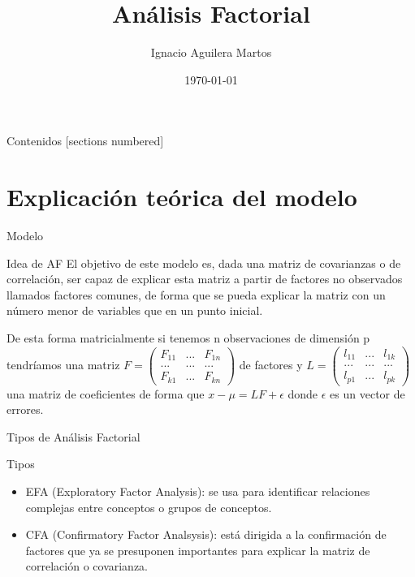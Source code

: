 \documentclass[10pt]{beamer}
\title{Análisis Factorial}
\author{Ignacio Aguilera Martos}
\date{\today}
\institute{Estadística Multivariante \\ \href{https://github.com/nacheteam/Analisis-Factorial}{Link: \underline{Documentos LaTeX en GitHub}}}
\begin{document}
\maketitle

\begin{frame}[fragile]{Contenidos}
  [sections numbered]
  \tableofcontents[hideallsubsections]
\end{frame}


\section{Explicación teórica del modelo}

\begin{frame}[fragile]{Modelo}
	\vspace{10px}
	\pause
	\begin{alertblock}{Idea de AF}
		El objetivo de este modelo es, dada una matriz de covarianzas o de correlación, ser capaz de explicar esta matriz a partir de factores no observados llamados factores comunes, de forma que se pueda explicar la matriz con un número menor de variables que en un punto inicial.
	\end{alertblock}
	De esta forma matricialmente si tenemos n observaciones de dimensión p tendríamos una matriz
	$F=
	\begin{pmatrix}
	F_{11} & ... & F_{1n} \\
	... & ... & ... \\
	F_{k1} & ... & F_{kn}
	\end{pmatrix}
	$ de factores y 
	$L=
	\begin{pmatrix}
	l_{11} & ... & l_{1k} \\
	... & ... & ... \\
	l_{p1} & ... & l_{pk}	
	\end{pmatrix}
	$ una matriz de coeficientes de forma que $x-\mu = LF + \epsilon$ donde $\epsilon$ es un vector de errores.
\end{frame}

\begin{frame}[fragile]{Tipos de Análisis Factorial}
\vspace{10px}
\pause
{}
\begin{block}{Tipos}
	\begin{itemize}
		\item EFA (Exploratory Factor Analysis): se usa para identificar relaciones complejas entre conceptos o grupos de conceptos.
		\pause
		\item CFA (Confirmatory Factor Analsysis): está dirigida a la confirmación de factores que ya se presuponen importantes para explicar la matriz de correlación o covarianza.
	\end{itemize}
\end{block}
\end{frame}
\end{document}
